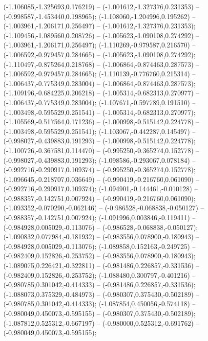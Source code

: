  (-1.106085,-1.325693,0.176219) -- (-1.001612,-1.327376,0.231353) -- (-0.998587,-1.453440,0.198965);
 (-1.108060,-1.204996,0.195262) -- (-1.003961,-1.206171,0.256497) -- (-1.001612,-1.327376,0.231353);
 (-1.109456,-1.089560,0.208726) -- (-1.005623,-1.090108,0.274292) -- (-1.003961,-1.206171,0.256497);
 (-1.110269,-0.979587,0.216570) -- (-1.006592,-0.979457,0.284665) -- (-1.005623,-1.090108,0.274292);
 (-1.110497,-0.875264,0.218768) -- (-1.006864,-0.874463,0.287573) -- (-1.006592,-0.979457,0.284665);
 (-1.110139,-0.776760,0.215314) -- (-1.006437,-0.775349,0.283004) -- (-1.006864,-0.874463,0.287573);
 (-1.109196,-0.684225,0.206218) -- (-1.005314,-0.682313,0.270977) -- (-1.006437,-0.775349,0.283004);
 (-1.107671,-0.597789,0.191510) -- (-1.003498,-0.595529,0.251541) -- (-1.005314,-0.682313,0.270977);
 (-1.105569,-0.517564,0.171236) -- (-1.000998,-0.515142,0.224778) -- (-1.003498,-0.595529,0.251541);
 (-1.103067,-0.442287,0.145497) -- (-0.998027,-0.439883,0.191293) -- (-1.000998,-0.515142,0.224778);
 (-1.100726,-0.367581,0.114470) -- (-0.995250,-0.365274,0.152778) -- (-0.998027,-0.439883,0.191293);
 (-1.098586,-0.293067,0.078184) -- (-0.992716,-0.290917,0.109374) -- (-0.995250,-0.365274,0.152778);
 (-1.096645,-0.218707,0.036649) -- (-0.990419,-0.216760,0.061090) -- (-0.992716,-0.290917,0.109374);
 (-1.094901,-0.144461,-0.010128) -- (-0.988357,-0.142751,0.007924) -- (-0.990419,-0.216760,0.061090);
 (-1.093352,-0.070290,-0.062146) -- (-0.986528,-0.068838,-0.050127) -- (-0.988357,-0.142751,0.007924);
 (-1.091996,0.003846,-0.119411) -- (-0.984928,0.005029,-0.113076) -- (-0.986528,-0.068838,-0.050127);
 (-1.090832,0.077984,-0.181932) -- (-0.983556,0.078900,-0.180943) -- (-0.984928,0.005029,-0.113076);
 (-1.089858,0.152163,-0.249725) -- (-0.982409,0.152826,-0.253752) -- (-0.983556,0.078900,-0.180943);
 (-1.089075,0.226421,-0.322811) -- (-0.981486,0.226857,-0.331536) -- (-0.982409,0.152826,-0.253752);
 (-1.088480,0.300797,-0.401216) -- (-0.980785,0.301042,-0.414333) -- (-0.981486,0.226857,-0.331536);
 (-1.088073,0.375329,-0.484973) -- (-0.980307,0.375430,-0.502189) -- (-0.980785,0.301042,-0.414333);
 (-1.087854,0.450056,-0.574118) -- (-0.980049,0.450073,-0.595155) -- (-0.980307,0.375430,-0.502189);
 (-1.087812,0.525312,-0.667197) -- (-0.980000,0.525312,-0.691762) -- (-0.980049,0.450073,-0.595155);
